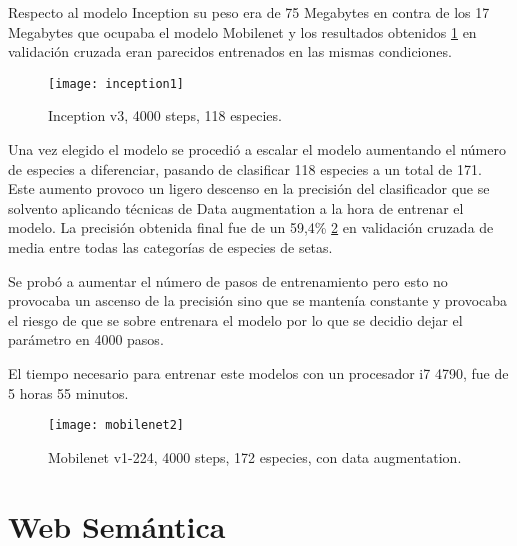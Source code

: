 Respecto al modelo Inception su peso era de 75 Megabytes en contra de los 17 Megabytes que ocupaba el modelo Mobilenet y los resultados obtenidos \ref{figInception1} en validación cruzada eran parecidos entrenados en las mismas condiciones. 

\begin{figure}[h]
    \begin{center}%
        \begin{center}%
          \texttt{[image: inception1]}%
          \caption{Inception v3, 4000 steps, 118 especies.}%
          \label{figInception1}%
        \end{center}%
  	\end{center}%
\end{figure}%

Una vez elegido el modelo se procedió a escalar el modelo aumentando el número de especies a diferenciar, pasando de clasificar 118 especies a un total de 171. Este aumento provoco un ligero descenso en la precisión del clasificador que se solvento aplicando técnicas de Data augmentation a la hora de entrenar el modelo. La precisión obtenida final fue de un 59,4\% \ref{figMobilenet2} en validación cruzada de media entre todas las categorías de especies de setas.

Se probó a aumentar el número de pasos de entrenamiento pero esto no provocaba un ascenso de la precisión sino que se mantenía constante y provocaba el riesgo de que se sobre entrenara el modelo por lo que se decidio dejar el parámetro en 4000 pasos.

El tiempo necesario para entrenar este modelos con un procesador i7 4790, fue de 5 horas 55 minutos.

\begin{figure}[h]
    \begin{center}%
        \begin{center}%
          \texttt{[image: mobilenet2]}%
          \caption{Mobilenet v1-224, 4000 steps, 172 especies, con data augmentation.}%
          \label{figMobilenet2}%
        \end{center}%
  	\end{center}%
\end{figure}%

\section{Web Semántica}


